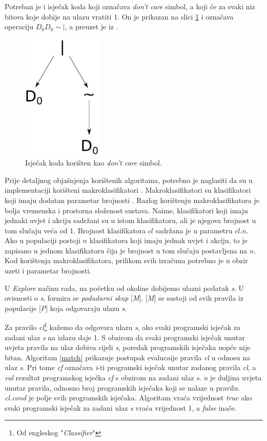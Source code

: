 \documentclass[times, utf8, zavrsni]{fer}
\begin{document}
Potreban je i isječak koda koji označava \emph{don't care} simbol, a koji će za svaki niz bitova koje dobije na ulazu vratiti 1.
On je prikazan na slici \ref{dnc} i označava operaciju $D_{0}D_{0}\sim|$, a preuzet je iz \citep{4}.
\begin{figure}[h]
    \centering
    \includegraphics[height=6cm]{img/dnc.pdf}
    \caption{Isječak koda korišten kao \emph{don't care} simbol.}
    \label{dnc}
\end{figure}

Prije detaljnog objašnjenja korištenih algoritama, potrebno je naglasiti da su u implementaciji korišteni makroklasifikatori  \citep{2}.
Makroklasifikatori su klasifikatori koji imaju dodatan parametar brojnosti .
Razlog korištenju makroklasifikatora je bolja vremenska i prostorna složenost sustava.
Naime, klasifikatori koji imaju jednaki uvjet i akciju sadržani su u istom klasifikatoru, ali je njegova brojnost u tom slučaju veća od 1.
Brojnost klasifikatora $cl$ sadržana je u parametru $cl.n$.
Ako u populaciji postoji $n$ klasifikatora koji imaju jednak uvjet i akciju, to je zapisano u jednom klasifikatoru čija je brojnost u tom slučaju postavljena na $n$.
Kod korištenja makroklasifikatora, prilikom svih izračuna potrebno je u obzir uzeti i parametar brojnosti.

U \emph{Explore} načinu rada, na početku od okoline dobijemo ulazni podatak \emph{s}.
U ovisnosti o \emph{s}, formira se \emph{podudarni skup}  [\emph{M}].
[\emph{M}] se sastoji od svih pravila iz populacije [\emph{P}] koja odgovaraju ulazu \emph{s}.

Za pravilo \emph{cl}\footnote{Od engleskog "\emph{Classifier}"} kažemo da odgovara ulazu \emph{s}, ako svaki programski isječak za zadani ulaz \emph{s} na izlazu daje 1.
S obzirom da svaki programski isječak unutar uvjeta pravila na ulaz dobiva cijeli \emph{s}, poredak programskih isječaka uopće nije bitan.
Algoritam \ref{match} prikazuje postupak evalucaije pravila \emph{cl} u odnosu na ulaz \emph{s}.
Pri tome \emph{cf} označava \emph{i}-ti programski isječak unutar zadanog pravila \emph{cl}, a \emph{val} rezultat programskog isječka \emph{cf} s obzirom na zadani ulaz \emph{s}.
\emph{n} je duljina uvjeta unutar pravila, odnosno broj programskih isječaka koji se nalaze u pravilu.
\emph{cl.cond} je polje svih programskih isječaka.
Algoritam vraća vrijednost \emph{true} ako svaki programski isječak za zadani ulaz \emph{s} vraća vrijednost 1, a \emph{false} inače.
\end{document}
